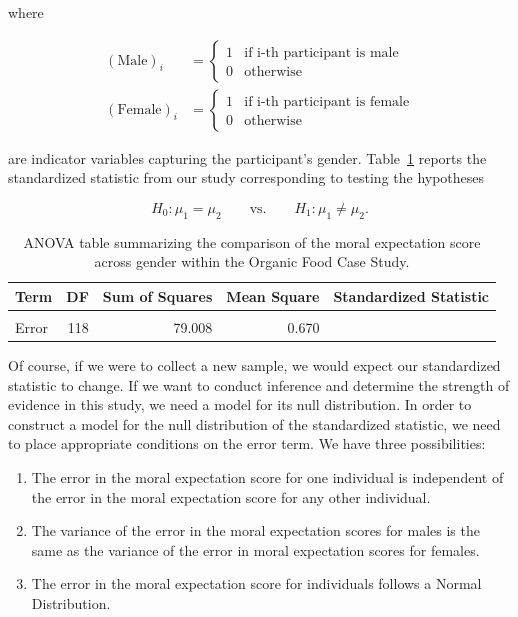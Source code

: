 \documentclass[
  letterpaper,
  DIV=11,
  numbers=noendperiod]{scrreprt}
\providecommand{\tightlist}{%
  \setlength{\itemsep}{0pt}\setlength{\parskip}{0pt}}\usepackage{longtable,booktabs,array}
\theoremstyle{plain}
\theoremstyle{definition}
\theoremstyle{definition}
\theoremstyle{remark}
\begin{document}
where

\[
\begin{aligned}
  (\text{Male})_i &= \begin{cases}
    1 & \text{if i-th participant is male} \\
    0 & \text{otherwise} 
    \end{cases} \\
  (\text{Female})_i &= \begin{cases}
    1 & \text{if i-th participant is female} \\
    0 & \text{otherwise}
    \end{cases}
\end{aligned}
\]

are indicator variables capturing the participant's gender.
Table~\ref{tbl-anovarecap-anova-table} reports the standardized
statistic from our study corresponding to testing the hypotheses

\[H_0: \mu_1 = \mu_2 \qquad \text{vs.} \qquad H_1: \mu_1 \neq \mu_2.\]

\hypertarget{tbl-anovarecap-anova-table}{}
\begin{table}
\caption{\label{tbl-anovarecap-anova-table}ANOVA table summarizing the comparison of the moral expectation score
across gender within the Organic Food Case Study. }\tabularnewline

\centering
\begin{tabular}[t]{lrrrr}
\toprule
Term & DF & Sum of Squares & Mean Square & Standardized Statistic\\
\midrule
\cellcolor{gray!6}{Gender} & \cellcolor{gray!6}{1} & \cellcolor{gray!6}{4.363} & \cellcolor{gray!6}{4.363} & \cellcolor{gray!6}{6.517}\\
Error & 118 & 79.008 & 0.670 & \\
\bottomrule
\end{tabular}
\end{table}

Of course, if we were to collect a new sample, we would expect our
standardized statistic to change. If we want to conduct inference and
determine the strength of evidence in this study, we need a model for
its null distribution. In order to construct a model for the null
distribution of the standardized statistic, we need to place appropriate
conditions on the error term. We have three possibilities:

\begin{enumerate}
\def\labelenumi{\arabic{enumi}.}
\tightlist
\item
  The error in the moral expectation score for one individual is
  independent of the error in the moral expectation score for any other
  individual.
\item
  The variance of the error in the moral expectation scores for males is
  the same as the variance of the error in moral expectation scores for
  females.
\item
  The error in the moral expectation score for individuals follows a
  Normal Distribution.
\end{enumerate}
\end{document}
